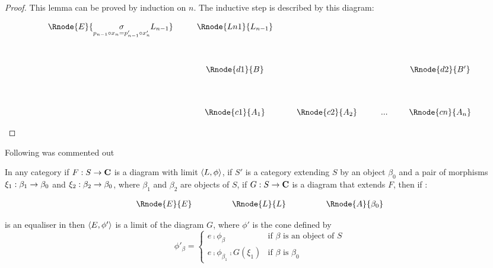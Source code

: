 \documentclass[10pt,a4paper]{scrartcl}
\begin{document}
\begin{proof}
\noindent This lemma can be proved by induction on $n$. 
The inductive step is described by this diagram:

\begin{center}
\begin{displaymath}
\begin{array}{cp{0.3cm}cp{0.3cm}c         p{0.3cm}  c p{0.2cm} c}
\Rnode{E}{\underset{p_{n-1} \comp x_n=p'_{n-1} \comp x'_n}{\sigma}L_{n-1}}&&\Rnode{Ln1}{L_{n-1}}& &               & &     & &                \\ [1.4cm]
&&\Rnode{d1}{B}& &               & &     & &\Rnode{d2}{B'}  \\ [1.4cm]
&&\Rnode{c1}{A_1}& &\Rnode{c2}{A_2}& & ... & &\Rnode{cn}{A_n}
\end{array}
\end{displaymath}
\end{center}

\end{proof}
Following was commented out
\begin{lemma}
In any category  if $F: S \rightarrow \textbf{C}$ is a diagram with limit $\langle L,\phi\rangle$,
if $S'$ is a category extending $S$ by an object $\beta_0$ and a pair of morphisms $\xi_1: \beta_1 \rightarrow \beta_0$ and $\xi_2: \beta_2 \rightarrow \beta_0$, where $\beta_1$ and $\beta_2$ are objects of $S$, if $G: S \rightarrow \textbf{C}$ is a diagram that extends $F$, then if :
\begin{center}
\begin{equation}
\label{equaliser}
\begin{array}{cp{1cm}cp{1cm} c}
\Rnode{E}{E}& &    \Rnode{L}{L}  & & \Rnode{A}{\beta_0} 
\end{array}
\end{equation}
\setlength{\arroffsetA}{3pt}
\setlength{\arroffsetB}{3pt}
\setlength{\arroffsetA}{-3pt}
\setlength{\arroffsetB}{-3pt}
\arreset
\end{center}
is an equaliser in  then $\langle E,\phi'\rangle$ is a limit of the diagram $G$, where
$\phi'$ is the cone defined by
\begin{equation*}
\phi'_\beta =
\left\{
	\begin{array}{ll}
		e \comp \phi_\beta           & \mbox{if } \beta \mbox{ is an object of } S  \\
		e \comp \phi_{\beta_1} \comp G(\xi_1) & \mbox{if } \beta \mbox{ is } \beta_0 
	\end{array}
\right.
\end{equation*}

\end{lemma}
\end{document}

